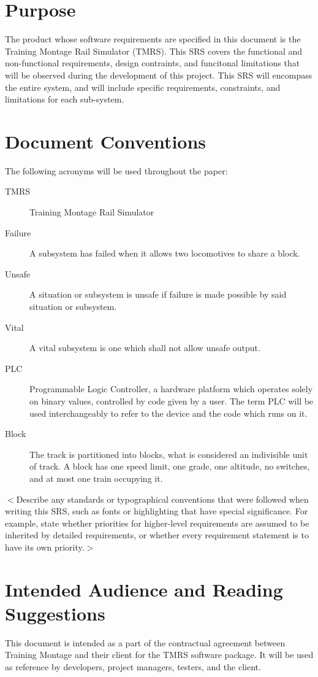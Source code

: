 \documentclass{scrreprt}
\begin{document}
\section{Purpose}
The product whose software requirements are specified in this document is the
Training Montage Rail Simulator (TMRS). This SRS covers the functional and 
non-functional requirements, design contraints, and funcitonal limitations that
will be observed during the development of this project. This SRS will encompass
the entire system, and will include specific requirements, constraints, and 
limitations for each sub-system.

\section{Document Conventions}
The following acronyms will be used throughout the paper:
\begin{description}
  \item[TMRS] Training Montage Rail Simulator
  \item[Failure] A subsystem has failed when it allows two locomotives to share a block.
  \item[Unsafe] A situation or subsystem is unsafe if failure is made possible by said situation or subsystem.
  \item[Vital] A vital subsystem is one which shall not allow unsafe output.
  \item[PLC] Programmable Logic Controller, a hardware platform which operates solely on binary values, controlled by code given by a user. The term PLC will be used interchangeably to refer to the device and the code which runs on it.
  \item[Block] The track is partitioned into blocks, what is considered an indivisible unit of track. A block has one speed limit, one grade, one altitude, no switches, and at most one train occupying it.
\end{description}

$<$Describe any standards or typographical conventions that were followed when 
writing this SRS, such as fonts or highlighting that have special significance.  
For example, state whether priorities  for higher-level requirements are assumed 
to be inherited by detailed requirements, or whether every requirement statement 
is to have its own priority.$>$

\section{Intended Audience and Reading Suggestions}
This document is intended as a part of the contractual agreement between Training
Montage and their client for the TMRS software package. It will be used as reference
by developers, project managers, testers, and the client.
\end{document}
